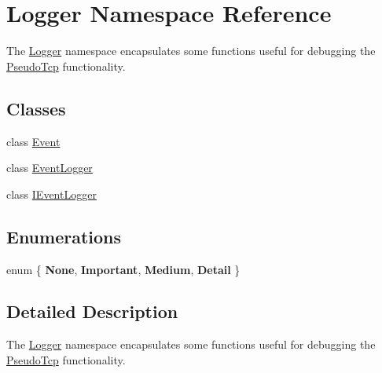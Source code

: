 \hypertarget{namespaceLogger}{
\section{Logger Namespace Reference}
\label{namespaceLogger}
}


The \hyperlink{namespaceLogger}{Logger} namespace encapsulates some functions useful for debugging the \hyperlink{namespacePseudoTcp}{PseudoTcp} functionality.  


\subsection*{Classes}
\begin{DoxyCompactItemize}
\item 
class \hyperlink{classLogger_1_1Event}{Event}
\item 
class \hyperlink{classLogger_1_1EventLogger}{EventLogger}
\item 
class \hyperlink{classLogger_1_1IEventLogger}{IEventLogger}
\end{DoxyCompactItemize}
\subsection*{Enumerations}
\begin{DoxyCompactItemize}
\item 
enum \{ {\bfseries None}, 
{\bfseries Important}, 
{\bfseries Medium}, 
{\bfseries Detail}
 \}
\end{DoxyCompactItemize}


\subsection{Detailed Description}
The \hyperlink{namespaceLogger}{Logger} namespace encapsulates some functions useful for debugging the \hyperlink{namespacePseudoTcp}{PseudoTcp} functionality. 